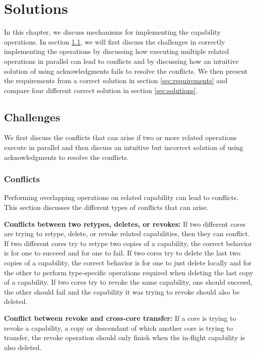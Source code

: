 \documentclass[a4paper,twoside]{report} %
\begin{document}

\chapter{Solutions}\label{chap:solutions}
In this chapter, we discuss mechanisms for implementing the capability
operations. In section \ref{sec:challenges}, we will first discuss the
challenges in correctly implementing the operations by discussing how
executing multiple related operations in parallel can lead to
conflicts and by discussing how an intuitive solution of using
acknowledgments fails to resolve the conflicts. We then present the
requirements from a correct solution in section \ref{sec:requirements}
and compare four different correct solution in section
\ref{sec:solutions}.

\section{Challenges}\label{sec:challenges}
We first discuss the conflicts that can arise if two or more related
operations execute in parallel and then discuss an intuitive but
incorrect solution of using acknowledgments to resolve the conflicts.

\subsection{Conflicts}\label{subsec:conflicts}
Performing overlapping operations on related capability can lead to
conflicts. This section discusses the different types of conflicts
that can arise.

\textbf{Conflicts between two retypes, deletes, or revokes:} If two
different cores are trying to retype, delete, or revoke related
capabilities, then they can conflict. If two different cores try to
retype two copies of a capability, the correct behavior is for one to
succeed and for one to fail. If two cores try to delete the last two
copies of a capability, the correct behavior is for one to just delete
locally and for the other to perform type-specific operations required
when deleting the last copy of a capability. If two cores try to
revoke the same capability, one should succeed, the other should fail
and the capability it was trying to revoke should also be deleted.

\textbf{Conflict between revoke and cross-core transfer:} If a core is
trying to revoke a capability, a copy or descendant of which another
core is trying to transfer, the revoke operation should only finish
when the in-flight capability is also deleted.
\end{document}
